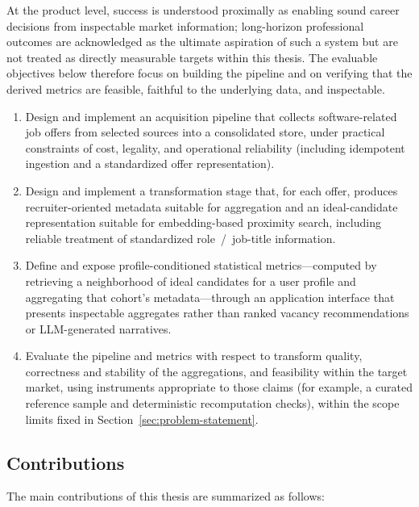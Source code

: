 At the product level, success is understood proximally as enabling sound career decisions from inspectable market information; long-horizon professional outcomes are acknowledged as the ultimate aspiration of such a system but are not treated as directly measurable targets within this thesis.
The evaluable objectives below therefore focus on building the pipeline and on verifying that the derived metrics are feasible, faithful to the underlying data, and inspectable.

\begin{enumerate}
  \item Design and implement an acquisition pipeline that collects software-related job offers from selected sources into a consolidated store, under practical constraints of cost, legality, and operational reliability (including idempotent ingestion and a standardized offer representation).
  \item Design and implement a transformation stage that, for each offer, produces recruiter-oriented metadata suitable for aggregation and an ideal-candidate representation suitable for embedding-based proximity search, including reliable treatment of standardized role~/~job-title information.
  \item Define and expose profile-conditioned statistical metrics---computed by retrieving a neighborhood of ideal candidates for a user profile and aggregating that cohort's metadata---through an application interface that presents inspectable aggregates rather than ranked vacancy recommendations or LLM-generated narratives.
  \item Evaluate the pipeline and metrics with respect to transform quality, correctness and stability of the aggregations, and feasibility within the target market, using instruments appropriate to those claims (for example, a curated reference sample and deterministic recomputation checks), within the scope limits fixed in Section~\ref{sec:problem-statement}.
\end{enumerate}

\subsection{Contributions}
\label{sec:contributions}

The main contributions of this thesis are summarized as follows:

